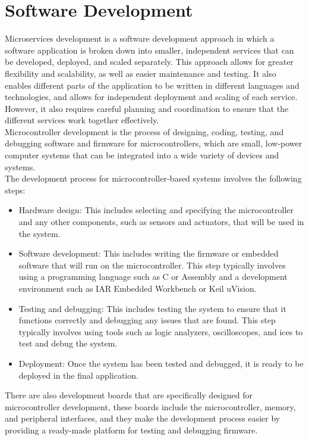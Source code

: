 \section{Software Development}
Microservices development is a software development approach in which a software application is broken down into smaller, independent services that can be developed, deployed, and scaled separately. This approach allows for greater flexibility and scalability, as well as easier maintenance and testing. It also enables different parts of the application to be written in different languages and technologies, and allows for independent deployment and scaling of each service. However, it also requires careful planning and coordination to ensure that the different services work together effectively.\vspace{5mm} \\
Microcontroller development is the process of designing, coding, testing, and debugging software and firmware for microcontrollers, which are small, low-power computer systems that can be integrated into a wide variety of devices and systems.\vspace{5mm} \\
The development process for microcontroller-based systems involves the following steps:
\begin{itemize}
\item Hardware design: This includes selecting and specifying the microcontroller and any other components, such as sensors and actuators, that will be used in the system.
\item Software development: This includes writing the firmware or embedded software that will run on the microcontroller. This step typically involves using a programming language such as C or Assembly and a development environment such as IAR Embedded Workbench or Keil uVision.
\item Testing and debugging: This includes testing the system to ensure that it functions correctly and debugging any issues that are found. This step typically involves using tools such as logic analyzers, oscilloscopes, and \glspl{ice} to test and debug the system.
\item Deployment: Once the system has been tested and debugged, it is ready to be deployed in the final application.
\end{itemize}
There are also development boards that are specifically designed for microcontroller development, these boards include the microcontroller, memory, and peripheral interfaces, and they make the development process easier by providing a ready-made platform for testing and debugging firmware.

